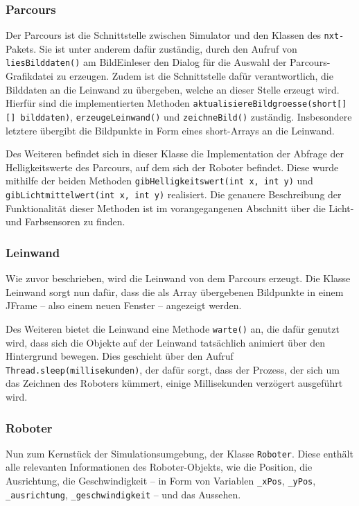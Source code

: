 \documentclass[paper=a4, DIV=calc, BCOR=12mm, twoside=on, onecolumn=on, open = right, titlepage =on, parskip =half-, headsepline = on, footsepline = off, chapterprefix = off, appendixprefix = on, fontsize = 12pt, numbers = noenddot, abstract = on]{scrbook}
\begin{document}
\subsubsection{Parcours}
Der Parcours ist die Schnittstelle zwischen Simulator und den Klassen des \texttt{nxt-}Pakets. Sie ist unter anderem dafür zuständig, durch den Aufruf von \texttt{liesBilddaten()} am BildEinleser den Dialog für die Auswahl der Parcours-Grafikdatei zu erzeugen. Zudem ist die Schnittstelle dafür verantwortlich, die Bilddaten an die Leinwand zu übergeben, welche an dieser Stelle erzeugt wird. Hierfür sind die implementierten Methoden \texttt{aktualisiere\-Bildgroes\-se(short[][] bild\-daten)}, \texttt{er\-zeu\-ge\-Lein\-wand()} und \texttt{zeichneBild()} zuständig. Insbesondere letztere übergibt die Bildpunkte in Form eines short-Arrays an die Leinwand.

Des Weiteren befindet sich in dieser Klasse die Implementation der Abfrage der Helligkeitswerte des Parcours, auf dem sich der Roboter befindet. Diese wurde mithilfe der beiden Methoden \texttt{gib\-Hellig\-keits\-wert(int x, int y)} und \texttt{gib\-Licht\-mittel\-wert(int x, int y)} realisiert. Die genauere Beschreibung der Funktionalität dieser Methoden ist im vorangegangenen Abschnitt über die Licht- und Farbsensoren zu finden.

\subsubsection{Leinwand}
Wie zuvor beschrieben, wird die Leinwand von dem Parcours erzeugt. Die Klasse Leinwand sorgt nun dafür, dass die als Array übergebenen Bildpunkte in einem JFrame -- also einem neuen Fenster -- angezeigt werden.

Des Weiteren bietet die Leinwand eine Methode \texttt{warte()} an, die dafür genutzt wird, dass sich die Objekte auf der Leinwand tatsächlich animiert über den Hintergrund bewegen. Dies geschieht über den Aufruf \texttt{Thread.sleep(millise\-kun\-den)}, der dafür sorgt, dass der Prozess, der sich um das Zeichnen des Roboters kümmert, einige Millisekunden verzögert ausgeführt wird.

\subsubsection{Roboter}
Nun zum Kernstück der Simulationsumgebung, der Klasse \texttt{Roboter}. Diese enthält alle relevanten Informationen des Roboter-Objekts, wie die Position, die Ausrichtung, die Geschwindigkeit -- in Form von Variablen \texttt{{\_}xPos}, \texttt{{\_}yPos}, \texttt{{\_}aus\-rich\-tung},  \texttt{{\_}ge\-schwin\-dig\-keit} -- und das Aussehen. 
\end{document}
